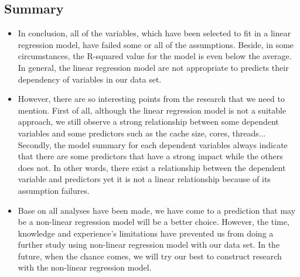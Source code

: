 \documentclass[a4paper]{article}
\begin{document}
\subsection{Summary}
\begin{itemize}
    \item[] In conclusion, all of the variables, which have been selected to fit in a linear regression model, have failed some or all of the assumptions. Beside, in some circumstances, the R-squared value for the model is even below the average. In general, the linear regression model are not appropriate to predicts their dependency of variables in our data set.
    
    \item[] However, there are so interesting points from the research that we need to mention. First of all, although the linear regression model is not a suitable approach, we still observe a strong relationship between some dependent variables and some predictors such as the cache size, cores, threads... Secondly, the model summary for each dependent variables always indicate that there are some predictors that have a strong impact while the others does not. In other words, there exist a relationship between the dependent variable and predictors yet it is not a linear relationship because of its assumption failures. 
    
    \item[] Base on all analyses have been made, we have come to a prediction that may be a non-linear regression model will be a better choice. However, the time, knowledge and experience's limitations have prevented us from doing a further study using non-linear regression model with our data set. In the future, when the chance comes, we will try our best to construct research with the non-linear regression model.  
\end{itemize}
\end{document}
